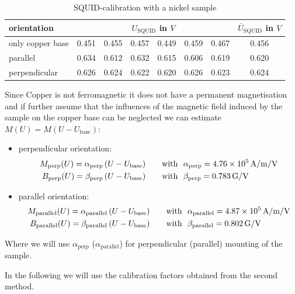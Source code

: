 \documentclass[paper=a4, fontsize=10pt]{scrartcl}
\begin{document}
\begin{table}[h]
  \centering
\begin{tabular}{l|c|c|c|c|c|c|c}
  orientation & \multicolumn{6}{c|}{$U_{\mathrm{SQUID}}$ in $\si{V}$} & $\bar{U}_{\mathrm{SQUID}}$ in $\si{V}$\\
  \toprule
only copper base & 0.451 & 0.455 & 0.457 & 0.449 & 0.459 & 0.467 & 0.456\\ 
parallel & 0.634 & 0.612 & 0.632 & 0.615 & 0.606 & 0.619 & 0.620\\ 
perpendicular & 0.626 & 0.624 & 0.622 & 0.620 & 0.626 & 0.623 & 0.624\\
  \bottomrule
\end{tabular}
\caption{SQUID-calibration with a nickel sample}
\label{table:nickel-squid}
\end{table}
Since Copper is not ferromagnetic it does not have a permanent
magnetisation and if further assume that the influences of the
magnetic field induced by the sample on the copper base can be
neglected we can estimate $M(U) = M(U-U_{\mathrm{base}})$:

\begin{itemize}
\item perpendicular orientation: \\
  \begin{align*}
    M_{\mathrm{perp}}(U) = \alpha_{\mathrm{perp}} \left( {U - U_{\mathrm{base}}} \right) &\qquad \mathrm{with}~~\alpha_{\mathrm{perp}} = \SI{4.76e5}{A\per m \per V} \\
    B_{\mathrm{perp}}(U) = \beta_{\mathrm{perp}} \left( {U - U_{\mathrm{base}}} \right) &\qquad \mathrm{with}~~\beta_{\mathrm{perp}} = \SI{0.783}{G \per V}
  \end{align*}
\item parallel orientation:
  \begin{align*}
    M_{\mathrm{parallel}}(U) = \alpha_{\mathrm{parallel}} \left( {U - U_{\mathrm{base}}} \right) &\qquad \mathrm{with}~~\alpha_{\mathrm{parallel}} = \SI{4.87e5}{A\per m \per V} \\
    B_{\mathrm{parallel}}(U) = \beta_{\mathrm{parallel}} \left( {U - U_{\mathrm{base}}} \right) &\qquad \mathrm{with}~~\beta_{\mathrm{parallel}} = \SI{0.802}{G \per V}
  \end{align*}
\end{itemize}

Where we will use $\alpha_{\mathrm{perp}}$
($\alpha_{\mathrm{parallel}}$) for perpendicular (parallel) mounting
of the sample.

In the following we will use the calibration factors obtained from the
second method.
\end{document}
